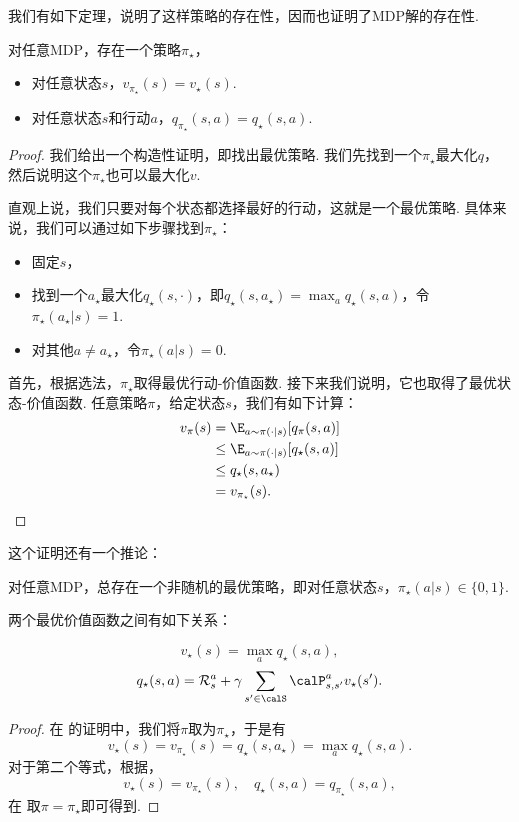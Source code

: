 我们有如下定理，说明了这样策略的存在性，因而也证明了MDP解的存在性. 
\begin{theorem}[MDP解的存在性]\label{thm:MDP-existence}
对任意MDP，存在一个策略$\pi_\star$，
\begin{itemize}
    \item 对任意状态$s$，$v_{\pi_\star}(s) = v_\star(s)$.
    \item 对任意状态$s$和行动$a$，$q_{\pi_\star}(s,a)=q_\star(s,a)$.
\end{itemize}
\end{theorem}

\begin{proof}
我们给出一个构造性证明，即找出最优策略. 我们先找到一个$\pi_\star$最大化$q$，然后说明这个$\pi_\star$也可以最大化$v$. 

直观上说，我们只要对每个状态都选择最好的行动，这就是一个最优策略. 具体来说，我们可以通过如下步骤找到$\pi_\star$：
\begin{itemize}
    \item 固定$s$，
    \item 找到一个$a_\star$最大化$q_\star(s,\cdot)$，即$q_\star(s,a_\star)=\max_{a}q_\star(s,a)$，令$\pi_\star(a_\star|s)=1$.
    \item 对其他$a\neq a_\star$，令$\pi_\star(a|s)=0$.
\end{itemize}
首先，根据选法，$\pi_\star$取得最优行动-价值函数. 接下来我们说明，它也取得了最优状态-价值函数. 任意策略$\pi$，给定状态$s$，我们有如下计算：
\begin{align*}
    v_\pi(s) &= \E_{a\sim\pi(\cdot|s)}[q_\pi(s,a)]\\
             &\leq \E_{a\sim\pi(\cdot|s)}[q_\star(s,a)]\\
             &\leq q_\star(s,a_\star)\\
             &=v_{\pi_\star}(s).
\end{align*}
\end{proof}
这个证明还有一个推论：
\begin{corollary}
    对任意MDP，总存在一个非随机的最优策略，即对任意状态$s$，$\pi_\star(a|s)\in\{0,1\}$.
\end{corollary}

两个最优价值函数之间有如下关系：
\begin{proposition}\label{prop:state-action-value-optimal}
\[v_\star(s) = \max_a q_\star(s,a),\]
\[q_\star(s,a) = \mathcal R_s^a + \gamma \sum_{s'\in \calS}\calP_{s,s'}^av_\star(s').\]
\end{proposition}
\begin{proof}
    在 的证明中，我们将$\pi$取为$\pi_\star$，于是有
    \[v_\star(s) = v_{\pi_\star}(s) = q_{\star}(s,a_\star) = \max_a q_\star(s,a).\]
    对于第二个等式，根据，
    \[v_\star(s) = v_{\pi_\star}(s),\quad q_\star(s,a) = q_{\pi_\star}(s,a),\]
    在 取$\pi=\pi_\star$即可得到.
\end{proof}

